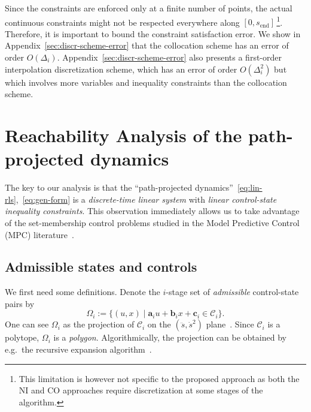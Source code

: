 \documentclass[journal]{IEEEtran}
\theoremstyle{plain}
\theoremstyle{definition}
\theoremstyle{definition}
\newcommand{\cC}{\mathscr{C}}
\newcommand{\rmend}{\mathrm{end}}
\begin{document}
Since the constraints are enforced only at a finite number of points,
the actual continuous constraints might not be respected everywhere
along $[0, s_\rmend]$\,\footnote{This limitation is however not
  specific to the proposed approach as both the NI and CO approaches
  require discretization at some stages of the algorithm.}. Therefore,
it is important to bound the constraint satisfaction error. We show in
Appendix~\ref{sec:discr-scheme-error} that the collocation scheme has
an error of order $O(\Delta_i)$. Appendix~\ref{sec:discr-scheme-error}
also presents a first-order interpolation discretization scheme, which
has an error of order $O(\Delta_i^2)$ but which involves more
variables and inequality constraints than the collocation scheme.


\section{Reachability Analysis of the path-projected dynamics}
\label{sec:reach-analys-}

The key to our analysis is that the ``path-projected
dynamics''~\eqref{eq:lin-rls},~\eqref{eq:gen-form} is a
\emph{discrete-time linear system} with \emph{linear control-state
  inequality constraints}. This observation immediately allows us to
take advantage of the set-membership control problems studied in the
Model Predictive Control (MPC)
literature~\cite{kerrigan2001robust,Bertsekas1971,rakovic2006reachability}.


\subsection{Admissible states and controls}
\label{sec:useful-definitions}

We first need some definitions. Denote the $i$-stage set of
\emph{admissible} control-state pairs by
\begin{equation*}
  \Omega_i:= \{(u, x) \mid \mathbf{a}_i u + \mathbf{b}_i x+ \mathbf{c}_i \in \cC_i\}.
\end{equation*}
One can see $\Omega_i$ as the projection of $\cC_i$ on the $(\ddot
s,\dot s^2)$ plane~\cite{hauser2014}. Since $\cC_i$ is a polytope,
$\Omega_i$ is a \emph{polygon}. Algorithmically, the projection can be
obtained by e.g.\ the recursive expansion
algorithm~\cite{bretl2008tro}.
\end{document}
